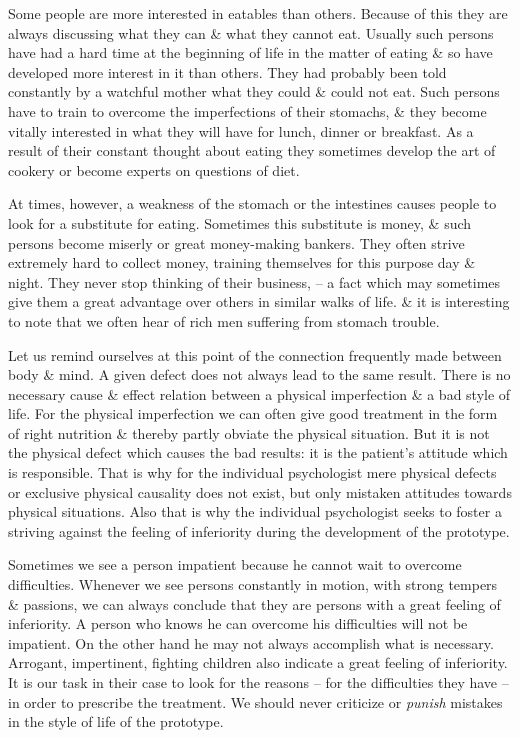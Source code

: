 \documentclass{article}
\numberwithin{equation}{section}
\begin{document}
Some people are more interested in eatables than others. Because of this they are always discussing what they can \& what they cannot eat. Usually such persons have had a hard time at the beginning of life in the matter of eating \& so have developed more interest in it than others. They had probably been told constantly by a watchful mother what they could \& could not eat. Such persons have to train to overcome the imperfections of their stomachs, \& they become vitally interested in what they will have for lunch, dinner or breakfast. As a result of their constant thought about eating they sometimes develop the art of cookery or become experts on questions of diet.

At times, however, a weakness of the stomach or the intestines causes people to look for a substitute for eating. Sometimes this substitute is money, \& such persons become miserly or great money-making bankers. They often strive extremely hard to collect money, training themselves for this purpose day \& night. They never stop thinking of their business, -- a fact which may sometimes give them a great advantage over others in similar walks of life. \& it is interesting to note that we often hear of rich men suffering from stomach trouble.

Let us remind ourselves at this point of the connection frequently made between body \& mind. A given defect does not always lead to the same result. There is no necessary cause \& effect relation between a physical imperfection \& a bad style of life. For the physical imperfection we can often give good treatment in the form of right nutrition \& thereby partly obviate the physical situation. But it is not the physical defect which causes the bad results: it is the patient's attitude which is responsible. That is why for the individual psychologist mere physical defects or exclusive physical causality does not exist, but only mistaken attitudes towards physical situations. Also that is why the individual psychologist seeks to foster a striving against the feeling of inferiority during the development of the prototype.

Sometimes we see a person impatient because he cannot wait to overcome difficulties. Whenever we see persons constantly in motion, with strong tempers \& passions, we can always conclude that they are persons with a great feeling of inferiority. A person who knows he can overcome his difficulties will not be impatient. On the other hand he may not always accomplish what is necessary. Arrogant, impertinent, fighting children also indicate a great feeling of inferiority. It is our task in their case to look for the reasons -- for the difficulties they have -- in order to prescribe the treatment. We should never criticize or \textit{punish} mistakes in the style of life of the prototype.
\end{document}
